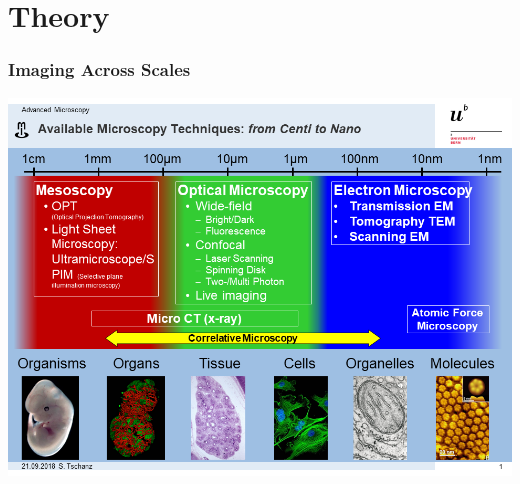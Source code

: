 \section{Theory}
\begin{frame}
	\frametitle{Imaging Across Scales}
	\centering%
	\includegraphics[height=\imageheight]{./images/MIC-AM_techniques}%
\end{frame}

